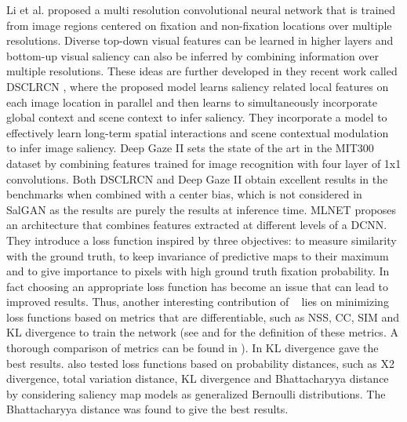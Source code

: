 \documentclass[times,twocolumn,final,authoryear]{elsarticle}
\begin{document}
Li et al. \citep{Li_2015_CVPR} proposed a multi resolution convolutional neural network that is trained from image regions centered on fixation and non-fixation locations over multiple  resolutions. Diverse top-down visual features can be learned in higher layers and  bottom-up visual saliency can also be inferred by combining information over multiple resolutions. 
These ideas are further developed in they recent work called DSCLRCN \cite{liu2018deep}, where the proposed model learns saliency related local features on each image location in parallel and then learns to simultaneously incorporate global context and scene context to infer saliency. They incorporate a model to effectively learn long-term spatial interactions and scene contextual modulation to infer image saliency. 
Deep Gaze II \citep{kummerer2017understanding} sets the state of the art in the MIT300 dataset by combining features trained for image recognition with four layer of 1x1 convolutions. 
Both DSCLRCN and Deep Gaze II obtain excellent results in the benchmarks when combined with a center bias, which is not considered in SalGAN as the results are purely the results at inference time.
MLNET \citep{mlnet2016} proposes an architecture that combines features extracted at different levels of a DCNN. They introduce a loss function inspired by three objectives: to measure similarity with the ground truth, to keep invariance of predictive maps to their maximum and to give importance to pixels with high ground truth fixation probability. In fact choosing an appropriate loss function has become an issue that can lead to improved results. Thus, another interesting contribution of ~\citep{huang2015salicon} lies on minimizing loss functions based on metrics that are differentiable, such as NSS, CC, SIM and KL divergence to train the network (see \cite{riche2013iccv} and  \cite{kummerer2054IG} for the definition of these metrics. A thorough comparison of metrics can be found in \citep{Bylinskii2016metrics}). In \citep{huang2015salicon} KL divergence gave the best results. \citep{jetley2016end} also tested loss functions based on probability distances, such as {X2} divergence, total variation distance, KL divergence and Bhattacharyya distance by considering saliency map models as generalized Bernoulli distributions. The Bhattacharyya distance was found to give the best results. 
\end{document}
